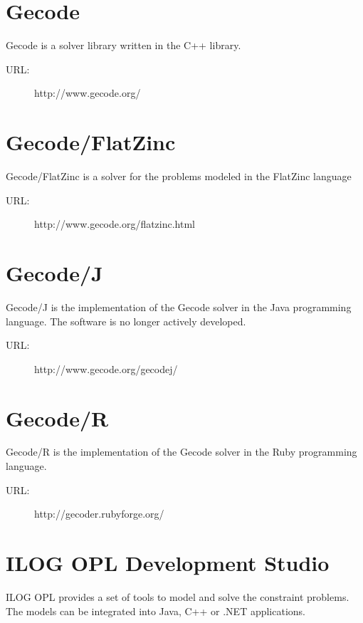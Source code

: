 \section*{Gecode}
Gecode is a solver library written in the C++ library. 

\begin{description}
	\item[URL:] http://www.gecode.org/
\end{description}  

\section*{Gecode/FlatZinc}
Gecode/FlatZinc is a solver for the problems modeled in the FlatZinc language  

\begin{description}
	\item[URL:] http://www.gecode.org/flatzinc.html
\end{description}  

\section*{Gecode/J}
Gecode/J is the implementation of the Gecode solver in the Java programming language.
The software is no longer actively developed. 

\begin{description}
	\item[URL:] http://www.gecode.org/gecodej/
\end{description}  

\section*{Gecode/R}
Gecode/R is the implementation of the Gecode solver in the Ruby programming language. 

\begin{description}
	\item[URL:] http://gecoder.rubyforge.org/
\end{description}  

\section*{ILOG OPL Development Studio}
ILOG OPL provides a set of tools to model and solve the constraint problems. The
models can be integrated into Java, C++ or .NET applications.


